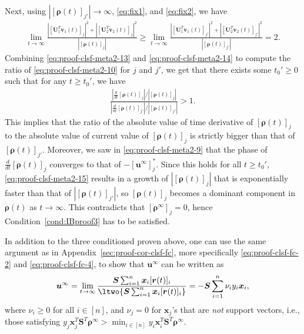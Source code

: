 \documentclass{article} %
\def\vr{{\bm{r}}}
\def\vu{{\bm{u}}}
\def\vv{{\bm{v}}}
\def\vx{{\bm{x}}}
\def\mS{{\bm{S}}}
\def\mU{{\bm{U}}}
\newcommand{\vrho}{{\bm{\rho}}}
\begin{document}
Next, using $|[\vrho(t)]_{j'}| \to \infty$, \eqref{eq:fix1}, and \eqref{eq:fix2}, we have
\begin{align}
	\label{eq:proof-clsf-meta2-14}
	\lim_{t\to\infty} \frac{|[\mU_1^T \vv_1(t)]_{j}|^2 + |[\mU_2^T \vv_2(t)]_{j}|^2}{|[\vrho(t)]_{j}|}
	\geq
	\lim_{t\to\infty} \frac{|[\mU_1^T \vv_1(t)]_{j'}|^2 + |[\mU_2^T \vv_2(t)]_{j'}|^2}{|[\vrho(t)]_{j'}|} = 2.
\end{align}
Combining \eqref{eq:proof-clsf-meta2-13} and \eqref{eq:proof-clsf-meta2-14} to compute the ratio of \eqref{eq:proof-clsf-meta2-10} for $j$ and $j'$, we get that there exists some $t_0' \geq 0$ such that for any $t \geq t_0'$, we have
\begin{align}
	\label{eq:proof-clsf-meta2-15}
	\frac{\left | \frac{d}{dt} [\vrho(t)]_j \right |/|[\vrho(t)]_j|}
	{\left | \frac{d}{dt} [\vrho(t)]_{j'} \right |/|[\vrho(t)]_{j'}|}
	> 1.
\end{align}
This implies that the ratio of the absolute value of time derivative of $[\vrho(t)]_j$ to the absolute value of current value of $[\vrho(t)]_j$ is strictly bigger than that of $[\vrho(t)]_{j'}$. 
Moreover, we saw in \eqref{eq:proof-clsf-meta2-9} that the phase of $\frac{d}{dt} [\vrho(t)]_j$ converges to that of $-[\vu^\infty]_j^*$. Since this holds for all $t \geq t_0'$, \eqref{eq:proof-clsf-meta2-15} results in a growth of $|[\vrho(t)]_j|$ that is exponentially faster than that of $|[\vrho(t)]_{j'}|$, so $[\vrho(t)]_j$ becomes a dominant component in $\vrho(t)$ as $t \to \infty$. This contradicts that $[\vrho^\infty]_j = 0$, hence Condition~\ref{cond:IBproof3} has to be satisfied.

In addition to the three conditioned proven above, one can use the same argument as in Appendix~\ref{sec:proof-cor-clsf-fc}, more specifically \eqref{eq:proof-clsf-fc-2} and \eqref{eq:proof-clsf-fc-4}, to show that $\vu^\infty$ can be written as
\begin{equation}
	\label{eq:proof-clsf-meta2-16}
	\vu^\infty = \lim_{t \to \infty} 
	\frac{\mS \sum_{i=1}^n \vx_i [\vr(t)]_i}
	{\ltwo{\mS \sum_{i=1}^n \vx_i [\vr(t)]_i}}
	= - \mS \sum_{i=1}^n \nu_i y_i \vx_i,
\end{equation}
where $\nu_i \geq 0$ for all $i \in [n]$, and $\nu_j = 0$ for $\vx_j$'s that are \emph{not} support vectors, i.e., those satisfying $y_j \vx_j^T \mS^T \vrho^\infty > \min_{i \in [n]} y_i \vx_i^T \mS^T \vrho^\infty$.
\end{document}
